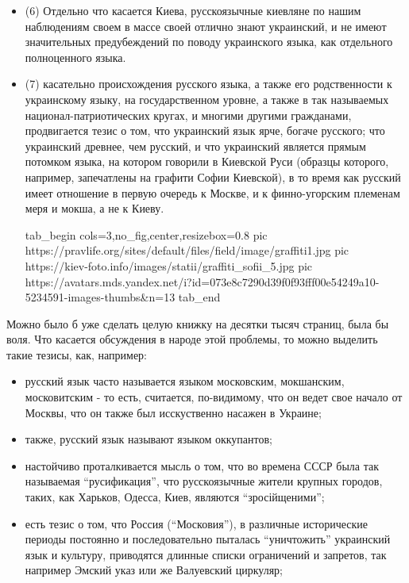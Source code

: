 \begin{itemize}
\item (6) Отдельно что касается Киева, русскоязычные киевляне по нашим
наблюдениям своем в массе своей отлично знают украинский, и не имеют
значительных предубеждений по поводу украинского языка, как отдельного
полноценного языка.

\item (7) касательно происхождения русского языка, а также его родственности к
украинскому языку, на государственном уровне, а также в так называемых
национал-патриотических кругах, и многими другими гражданами,
продвигается тезис о том, что украинский язык ярче, богаче
русского; что украинский древнее, чем русский, и что украинский
является прямым потомком языка, на котором говорили в Киевской
Руси (образцы которого, например, запечатлены на графити Софии
Киевской), в то время как русский имеет отношение в первую
очередь к Москве, и к финно-угорским племенам меря и мокша, а не к Киеву.

\ifcmt
  tab_begin cols=3,no_fig,center,resizebox=0.8
     pic https://pravlife.org/sites/default/files/field/image/graffiti1.jpg
		 pic https://kiev-foto.info/images/statii/graffiti_sofii_5.jpg
		 pic https://avatars.mds.yandex.net/i?id=073e8c7290d39f0f93fff00e54249a10-5234591-images-thumbs&n=13
  tab_end
\fi

\end{itemize} %

Можно было б уже сделать целую книжку на десятки тысяч страниц, была
бы воля. Что касается обсуждения в народе этой проблемы, то можно выделить такие тезисы, как, например:

\begin{itemize} %
\item русский язык часто называется языком московским, мокшанским, московитским - то есть, считается, по-видимому,
что он ведет свое начало от Москвы, что он также был исскуственно насажен в Украине;
\item также, русский язык называют языком оккупантов;
\item настойчиво проталкивается мысль о том, что во времена СССР была так
называемая \enquote{русификация}, что русскоязычные жители крупных городов,
таких, как Харьков, Одесса, Киев, являются \enquote{зросійщеними};
\item есть тезис о том, что Россия (\enquote{Московия}), в различные
исторические периоды постоянно и последовательно пыталась
\enquote{уничтожить} украинский язык и культуру, приводятся длинные
списки ограничений и запретов, так например Эмский указ или же
Валуевский циркуляр;
\end{itemize} %

